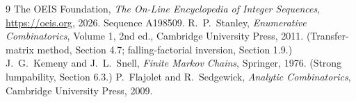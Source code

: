 \documentclass[11pt,a4paper]{article}
\theoremstyle{plain}
\theoremstyle{definition}
\begin{document}
\begin{thebibliography}{9}
 The OEIS Foundation, \emph{The On-Line Encyclopedia of Integer
Sequences}, \url{https://oeis.org}, 2026. Sequence A198509.
 R.~P.~Stanley, \emph{Enumerative Combinatorics}, Volume 1, 2nd ed.,
Cambridge University Press, 2011. (Transfer-matrix method, Section 4.7; falling-factorial
inversion, Section 1.9.)
 J.~G.~Kemeny and J.~L.~Snell, \emph{Finite Markov Chains}, Springer,
1976. (Strong lumpability, Section 6.3.)
 P.~Flajolet and R.~Sedgewick, \emph{Analytic Combinatorics}, Cambridge
University Press, 2009.
\end{thebibliography}
\end{document}
